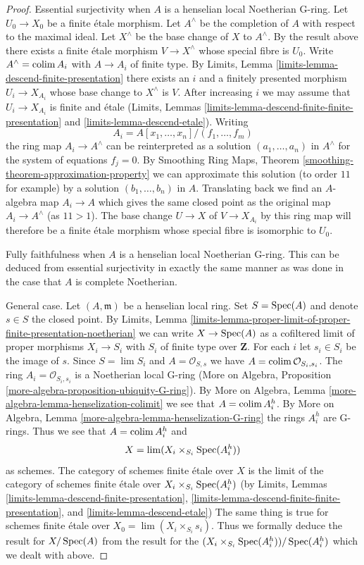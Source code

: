 \begin{proof}
\medskip\noindent
Essential surjectivity when $A$ is a henselian local Noetherian G-ring.
Let $U_0 \to X_0$ be a finite \'etale morphism.
Let $A^\wedge$ be the completion of $A$ with respect to the maximal ideal.
Let $X^\wedge$ be the base change of $X$ to $A^\wedge$.
By the result above there exists a finite \'etale morphism
$V \to X^\wedge$ whose special fibre is $U_0$.
Write $A^\wedge = \mathop{\mathrm{colim}}\nolimits A_i$ with $A \to A_i$ of finite type.
By Limits, Lemma \ref{limits-lemma-descend-finite-presentation}
there exists an $i$ and a finitely presented morphism $U_i \to X_{A_i}$
whose base change to $X^\wedge$ is $V$. After increasing $i$
we may assume that $U_i \to X_{A_i}$ is finite and \'etale
(Limits, Lemmas \ref{limits-lemma-descend-finite-finite-presentation} and
\ref{limits-lemma-descend-etale}). Writing
$$
A_i = A[x_1, \ldots, x_n]/(f_1, \ldots, f_m)
$$
the ring map $A_i \to A^\wedge$ can be reinterpreted as a solution
$(a_1, \ldots, a_n)$ in $A^\wedge$ for the system of equations $f_j = 0$.
By Smoothing Ring Maps, Theorem \ref{smoothing-theorem-approximation-property}
we can approximate this solution (to order $11$ for example) by a solution
$(b_1, \ldots, b_n)$ in $A$. Translating back we find an $A$-algebra map
$A_i \to A$ which gives the same closed point as the original map
$A_i \to A^\wedge$ (as $11 > 1$). The base change $U \to X$ of $V \to X_{A_i}$
by this ring map will therefore be a finite \'etale morphism whose
special fibre is isomorphic to $U_0$.

\medskip\noindent
Fully faithfulness when $A$ is a henselian local Noetherian G-ring.
This can be deduced from essential surjectivity in exactly the same
manner as was done in the case that $A$ is complete Noetherian.

\medskip\noindent
General case. Let $(A, \mathfrak m)$ be a henselian local ring.
Set $S = \mathop{\mathrm{Spec}}(A)$ and denote $s \in S$ the closed point. By Limits, Lemma
\ref{limits-lemma-proper-limit-of-proper-finite-presentation-noetherian}
we can write $X \to \mathop{\mathrm{Spec}}(A)$ as a cofiltered limit of
proper morphisms $X_i \to S_i$ with $S_i$ of finite type over $\mathbf{Z}$.
For each $i$ let $s_i \in S_i$ be the image of $s$.
Since $S = \lim S_i$ and $A = \mathcal{O}_{S, s}$ we have
$A = \mathop{\mathrm{colim}}\nolimits \mathcal{O}_{S_i, s_i}$. The ring $A_i = \mathcal{O}_{S_i, s_i}$
is a Noetherian local G-ring (More on Algebra, Proposition
\ref{more-algebra-proposition-ubiquity-G-ring}).
By More on Algebra, Lemma \ref{more-algebra-lemma-henselization-colimit}
we see that $A = \mathop{\mathrm{colim}}\nolimits A_i^h$. By
More on Algebra, Lemma \ref{more-algebra-lemma-henselization-G-ring}
the rings $A_i^h$ are G-rings. Thus we see that $A = \mathop{\mathrm{colim}}\nolimits A_i^h$ and
$$
X = \mathop{\mathrm{lim}}\nolimits (X_i \times_{S_i} \mathop{\mathrm{Spec}}(A_i^h))
$$
as schemes. The category of schemes finite \'etale over $X$ is the limit
of the category of schemes finite \'etale over
$X_i \times_{S_i} \mathop{\mathrm{Spec}}(A_i^h)$ (by
Limits, Lemmas
\ref{limits-lemma-descend-finite-presentation},
\ref{limits-lemma-descend-finite-finite-presentation}, and
\ref{limits-lemma-descend-etale})
The same thing is true for schemes finite \'etale over
$X_0 = \lim (X_i \times_{S_i} s_i)$.
Thus we formally deduce the result for $X / \mathop{\mathrm{Spec}}(A)$
from the result for the $(X_i \times_{S_i} \mathop{\mathrm{Spec}}(A_i^h)) / \mathop{\mathrm{Spec}}(A_i^h)$
which we dealt with above.
\end{proof}

